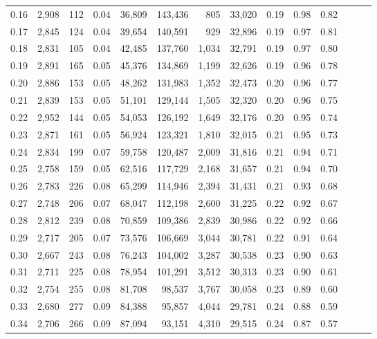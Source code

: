 \begin{tabular}{rrrrrrrrrrrrrr}
0.16 &  2,908 &  112 &  0.04 &   36,809 &  143,436 &     805 &  33,020 &  0.19 &  0.98 &      0.82 \\
0.17 &  2,845 &  124 &  0.04 &   39,654 &  140,591 &     929 &  32,896 &  0.19 &  0.97 &      0.81 \\
0.18 &  2,831 &  105 &  0.04 &   42,485 &  137,760 &   1,034 &  32,791 &  0.19 &  0.97 &      0.80 \\
0.19 &  2,891 &  165 &  0.05 &   45,376 &  134,869 &   1,199 &  32,626 &  0.19 &  0.96 &      0.78 \\
0.20 &  2,886 &  153 &  0.05 &   48,262 &  131,983 &   1,352 &  32,473 &  0.20 &  0.96 &      0.77 \\
0.21 &  2,839 &  153 &  0.05 &   51,101 &  129,144 &   1,505 &  32,320 &  0.20 &  0.96 &      0.75 \\
0.22 &  2,952 &  144 &  0.05 &   54,053 &  126,192 &   1,649 &  32,176 &  0.20 &  0.95 &      0.74 \\
0.23 &  2,871 &  161 &  0.05 &   56,924 &  123,321 &   1,810 &  32,015 &  0.21 &  0.95 &      0.73 \\
0.24 &  2,834 &  199 &  0.07 &   59,758 &  120,487 &   2,009 &  31,816 &  0.21 &  0.94 &      0.71 \\
0.25 &  2,758 &  159 &  0.05 &   62,516 &  117,729 &   2,168 &  31,657 &  0.21 &  0.94 &      0.70 \\
0.26 &  2,783 &  226 &  0.08 &   65,299 &  114,946 &   2,394 &  31,431 &  0.21 &  0.93 &      0.68 \\
0.27 &  2,748 &  206 &  0.07 &   68,047 &  112,198 &   2,600 &  31,225 &  0.22 &  0.92 &      0.67 \\
0.28 &  2,812 &  239 &  0.08 &   70,859 &  109,386 &   2,839 &  30,986 &  0.22 &  0.92 &      0.66 \\
0.29 &  2,717 &  205 &  0.07 &   73,576 &  106,669 &   3,044 &  30,781 &  0.22 &  0.91 &      0.64 \\
0.30 &  2,667 &  243 &  0.08 &   76,243 &  104,002 &   3,287 &  30,538 &  0.23 &  0.90 &      0.63 \\
0.31 &  2,711 &  225 &  0.08 &   78,954 &  101,291 &   3,512 &  30,313 &  0.23 &  0.90 &      0.61 \\
0.32 &  2,754 &  255 &  0.08 &   81,708 &   98,537 &   3,767 &  30,058 &  0.23 &  0.89 &      0.60 \\
0.33 &  2,680 &  277 &  0.09 &   84,388 &   95,857 &   4,044 &  29,781 &  0.24 &  0.88 &      0.59 \\
0.34 &  2,706 &  266 &  0.09 &   87,094 &   93,151 &   4,310 &  29,515 &  0.24 &  0.87 &      0.57 \\

\end{tabular}
